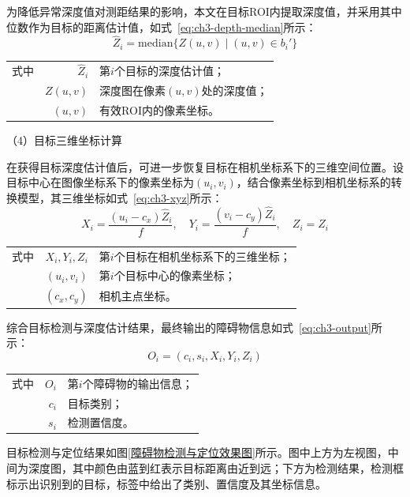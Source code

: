 为降低异常深度值对测距结果的影响，本文在目标ROI内提取深度值，并采用其中位数作为目标的距离估计值，如式~\eqref{eq:ch3-depth-median}所示：
\begin{equation}\label{eq:ch3-depth-median}
\hat{Z}_i=\mathrm{median}\{Z(u,v)\mid (u,v)\in b_i'\}
\end{equation}
\begin{tabularx}{\textwidth}{@{}l@{\quad}r@{———}X@{}}
式中& $\hat{Z}_i$ & 第$i$个目标的深度估计值；\\
& $Z(u,v)$ & 深度图在像素$(u,v)$处的深度值；\\
& $(u,v)$ & 有效ROI内的像素坐标。\\
\end{tabularx}\vspace{3.15bp}

（4）目标三维坐标计算

在获得目标深度估计值后，可进一步恢复目标在相机坐标系下的三维空间位置。设目标中心在图像坐标系下的像素坐标为$(u_i,v_i)$，结合像素坐标到相机坐标系的转换模型，其三维坐标如式~\eqref{eq:ch3-xyz}所示：
\begin{equation}\label{eq:ch3-xyz}
X_i=\frac{(u_i-c_x)\hat{Z}_i}{f},\quad
Y_i=\frac{(v_i-c_y)\hat{Z}_i}{f},\quad
Z_i=\hat{Z}_i
\end{equation}
\begin{tabularx}{\textwidth}{@{}l@{\quad}r@{———}X@{}}
式中& $X_i,Y_i,Z_i$ & 第$i$个目标在相机坐标系下的三维坐标；\\
& $(u_i,v_i)$ & 第$i$个目标中心的像素坐标；\\
& $(c_x,c_y)$ & 相机主点坐标。\\
\end{tabularx}\vspace{3.15bp}

综合目标检测与深度估计结果，最终输出的障碍物信息如式~\eqref{eq:ch3-output}所示：
\begin{equation}\label{eq:ch3-output}
O_i=(c_i,s_i,X_i,Y_i,Z_i)
\end{equation}
\begin{tabularx}{\textwidth}{@{}l@{\quad}r@{———}X@{}}
式中& $O_i$ & 第$i$个障碍物的输出信息；\\
& $c_i$ & 目标类别；\\
& $s_i$ & 检测置信度。\\
\end{tabularx}\vspace{3.15bp}

目标检测与定位结果如图\ref{障碍物检测与定位效果图}所示。图中上方为左视图，中间为深度图，其中颜色由蓝到红表示目标距离由近到远；下方为检测结果，检测框标示出识别到的目标，标签中给出了类别、置信度及其坐标信息。


